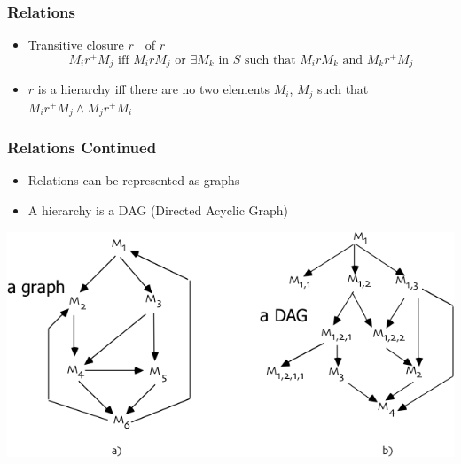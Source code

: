 \documentclass[t,12pt,numbers,fleqn]{beamer}
\begin{document}

\begin{frame}
\frametitle{Relations}

\begin{itemize}
\item Transitive closure $r^{+}$ of $r$
$$M_i r^{+} M_j \mbox{ iff } M_i r M_j \mbox{ or } \exists M_k \mbox{ in } S \mbox{ such that } M_i r M_k \mbox{ and } M_k
r^{+} M_j$$
\item $r$ is a hierarchy iff there are no two elements $M_i$, $M_j$ such that
  $M_i r^{+} M_j \wedge M_j r^{+} M_i$
\end{itemize}

\end{frame}


\begin{frame}
\frametitle{Relations Continued}

\begin{itemize}
\item Relations can be represented as graphs
\item A hierarchy is a DAG (Directed Acyclic Graph)
\end{itemize}

\begin{center}
\includegraphics[width=1.0\textwidth]{../Figures/GraphAndDAG.png}
\end{center}


\end{frame}

\end{document}
